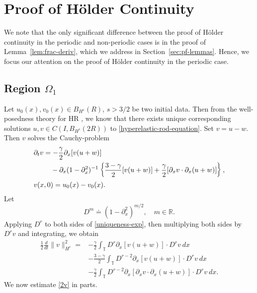 \documentclass[12pt,reqno]{amsart}
\numberwithin{equation}{section}  %
\numberwithin{figure}{section}
\newcommand{\rr}{\mathbb{R}}
\newcommand{\ci}{\mathbb{T}}
\newcommand{\p}{\partial}
\begin{document}
\section{Proof of H\"older Continuity}
%
We note that the only significant difference between the proof of H\"older
continuity in the periodic and non-periodic cases is in the proof of Lemma~\ref{lem:frac-deriv}, which we address in Section~\ref{sec:pf-lemmas}. Hence, we focus our
attention on the proof of H\"older continuity in the periodic case. 
%
%
\subsection{Region \texorpdfstring{$\Omega_{1}$}{}} 
\label{ssec:reg-m-imp}
%
%
Let $u_{0}(x), v_{0}(x)
\in B_{H^{s}}(R)$, $s > 3/2$ be two initial data. Then from
the well-posedness theory for HR \cite{Karapetyan:2010hk}, we
know that there exists unique corresponding solutions $u, v \in C(I,
B_{H^{s}}(2R))$ to \eqref{hyperelastic-rod-equation}.
Set $v=u-w$. Then $v$ solves the Cauchy-problem
%
%
\begin{align}
\label{uniqueness-exp}
& \p_t v
=  -\frac{\gamma}{2} \p_x [v(u + w)] 
\\
\notag
& \phantom{\p_t v = }-\p_x (1 - \p_{x}^{2})^{-1} \left\{
\frac{3-\gamma}{2}[v(u+w)] + \frac{\gamma}{2}[\p_x v \cdot \p_x (u+w)]
\right\},
\\
& v(x,0) = u_{0}(x) - v_{0}(x).
\label{uniqueness-init-data}
\end{align}
%
%
%
Let
\begin{equation*}
D^{m} \doteq (1 - \p_x^2)^{m/2}, \quad m \in \rr.
\end{equation*}
%
Applying $D^r$ to both sides of \eqref{uniqueness-exp}, then 
multiplying both sides by $D^r v$ and integrating, we obtain
%
%
\begin{equation}
\begin{split}
\frac{1}{2} \frac{d}{dt} \|v\|_{H^r}^2
= & -\frac{\gamma}{2} \int_{\ci} D^r \p_x [v(u+w)] \cdot
D^r v \ dx
\\
& - \frac{3-\gamma}{2} \int_{\ci}  D^{r -2}
\p_x[v(u+w)] \cdot
D^r v \ dx  
\\
& - \frac{\gamma}{2} \int_{\ci} D^{r 
-2} \p_x [ \p_x v
\cdot \p_x (u+w)]\cdot D^r v \ dx.
\label{2v}
\end{split}
\end{equation}
We now estimate \eqref{2v} in parts.
%
\end{document}
